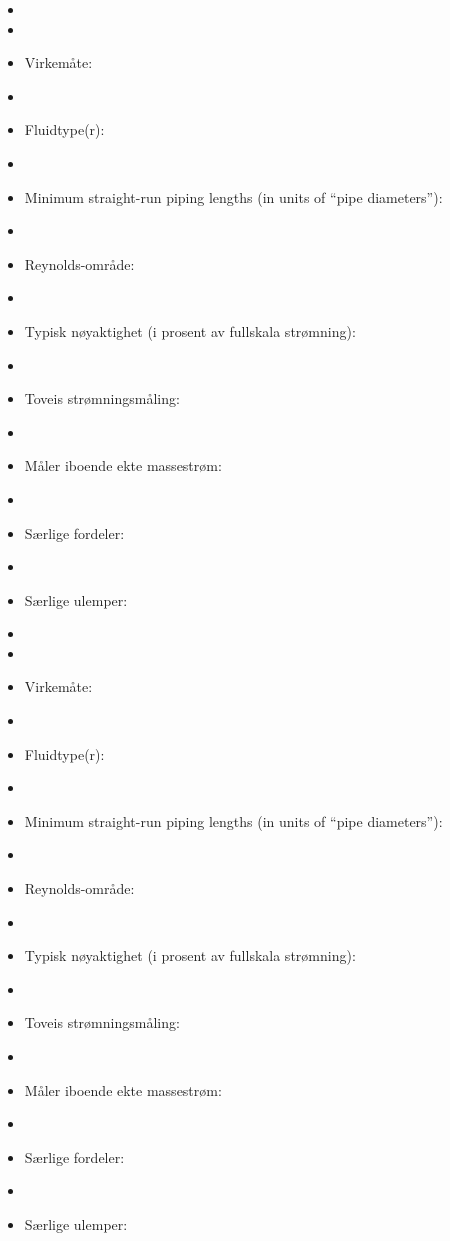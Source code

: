 \begin{itemize}
\goodbreak
\item{} 
\vskip 5pt
\item\item{} Virkemåte:
\vskip 5pt
\item\item{} Fluidtype(r):
\vskip 5pt
\item\item{} Minimum straight-run piping lengths (in units of ``pipe diameters''):
\vskip 5pt
\item\item{} Reynolds-område:
\vskip 5pt
\item\item{} Typisk nøyaktighet (i prosent av fullskala strømning):
\vskip 5pt
\item\item{} Toveis strømningsmåling:
\vskip 5pt
\item\item{} Måler iboende ekte massestrøm:
\vskip 5pt
\item\item{} Særlige fordeler:
\vskip 5pt
\item\item{} Særlige ulemper:
\end{itemize}

\begin{itemize}
\goodbreak
\item{} 
\vskip 5pt
\item\item{} Virkemåte:
\vskip 5pt
\item\item{} Fluidtype(r):
\vskip 5pt
\item\item{} Minimum straight-run piping lengths (in units of ``pipe diameters''):
\vskip 5pt
\item\item{} Reynolds-område:
\vskip 5pt
\item\item{} Typisk nøyaktighet (i prosent av fullskala strømning):
\vskip 5pt
\item\item{} Toveis strømningsmåling:
\vskip 5pt
\item\item{} Måler iboende ekte massestrøm:
\vskip 5pt
\item\item{} Særlige fordeler:
\vskip 5pt
\item\item{} Særlige ulemper:
\end{itemize}

